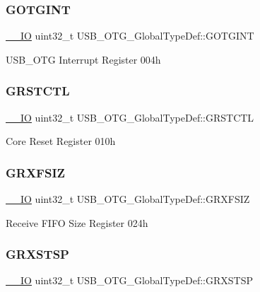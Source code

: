 \subsubsection{\texorpdfstring{GOTGINT}{GOTGINT}}
{\footnotesize\ttfamily \mbox{\hyperlink{core__sc300_8h_aec43007d9998a0a0e01faede4133d6be}{\+\_\+\+\_\+\+IO}} uint32\+\_\+t U\+S\+B\+\_\+\+O\+T\+G\+\_\+\+Global\+Type\+Def\+::\+G\+O\+T\+G\+I\+NT}

U\+S\+B\+\_\+\+O\+TG Interrupt Register 004h \mbox{\label{struct_u_s_b___o_t_g___global_type_def_a75148d8257eaeec482aa99f8b4a8b0fb}} 
\subsubsection{\texorpdfstring{GRSTCTL}{GRSTCTL}}
{\footnotesize\ttfamily \mbox{\hyperlink{core__sc300_8h_aec43007d9998a0a0e01faede4133d6be}{\+\_\+\+\_\+\+IO}} uint32\+\_\+t U\+S\+B\+\_\+\+O\+T\+G\+\_\+\+Global\+Type\+Def\+::\+G\+R\+S\+T\+C\+TL}

Core Reset Register 010h \mbox{\label{struct_u_s_b___o_t_g___global_type_def_ade50afc41de620913eaf1bc66d93cd3a}} 
\subsubsection{\texorpdfstring{GRXFSIZ}{GRXFSIZ}}
{\footnotesize\ttfamily \mbox{\hyperlink{core__sc300_8h_aec43007d9998a0a0e01faede4133d6be}{\+\_\+\+\_\+\+IO}} uint32\+\_\+t U\+S\+B\+\_\+\+O\+T\+G\+\_\+\+Global\+Type\+Def\+::\+G\+R\+X\+F\+S\+IZ}

Receive F\+I\+FO Size Register 024h \mbox{\label{struct_u_s_b___o_t_g___global_type_def_a060364111cf507dfab9bb6503477983a}} 
\subsubsection{\texorpdfstring{GRXSTSP}{GRXSTSP}}
{\footnotesize\ttfamily \mbox{\hyperlink{core__sc300_8h_aec43007d9998a0a0e01faede4133d6be}{\+\_\+\+\_\+\+IO}} uint32\+\_\+t U\+S\+B\+\_\+\+O\+T\+G\+\_\+\+Global\+Type\+Def\+::\+G\+R\+X\+S\+T\+SP}

